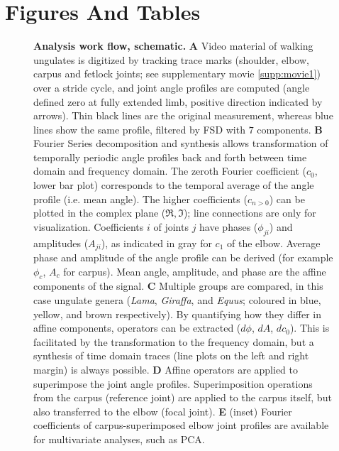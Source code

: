 \section{Figures And Tables}
\begin{figure}[!ht]
\begin{center}
\end{center}
\caption{\textbf{Analysis work flow, schematic. }
\textbf{A} Video material of walking ungulates is digitized by tracking trace marks (shoulder, elbow, carpus and fetlock joints; see supplementary movie \ref*{supp:movie1}) over a stride cycle, and joint angle profiles are computed (angle defined zero at fully extended limb, positive direction indicated by arrows). Thin black lines are the original measurement, whereas blue lines show the same profile, filtered by FSD with $7$ components.
\textbf{B} Fourier Series decomposition and synthesis allows transformation of temporally periodic angle profiles back and forth between time domain and frequency domain. The zeroth Fourier coefficient ($c_{0}$, lower bar plot) corresponds to the temporal average of the angle profile (i.e. mean angle). The higher coefficients ($c_{n>0}$) can be plotted in the complex plane ($\Re, \Im$); line connections are only for visualization. Coefficients $i$ of joints $j$ have phases ($\phi_{ji}$) and amplitudes ($A_{ji}$), as indicated in gray for $c_{1}$ of the elbow. Average phase and amplitude of the angle profile can be derived (for example $\phi_{c}$, $A_{c}$ for carpus). Mean angle, amplitude, and phase are the affine components of the signal.
\textbf{C} Multiple groups are compared, in this case ungulate genera (\textit{Lama}, \textit{Giraffa}, and \textit{Equus}; coloured in blue, yellow, and brown respectively). By quantifying how they differ in affine components, operators can be extracted ($d\phi$, $dA$, $dc_{0}$). This is facilitated by the transformation to the frequency domain, but a synthesis of time domain traces (line plots on the left and right margin) is always possible.
 \textbf{D} Affine operators are applied to superimpose the joint angle profiles. Superimposition operations from the carpus (reference joint) are applied to the carpus itself, but also transferred to the elbow (focal joint).
\textbf{E} (inset) Fourier coefficients of carpus-superimposed elbow joint profiles are available for multivariate analyses, such as PCA.
  }
\label{fig:workflow}
\end{figure}


